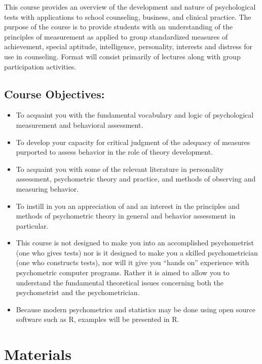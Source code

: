 \documentclass[
]{book}
\providecommand{\tightlist}{%
  \setlength{\itemsep}{0pt}\setlength{\parskip}{0pt}}
\begin{document}
This course provides an overview of the development and nature of psychological tests with applications to school counseling, business, and clinical practice. The purpose of the course is to provide students with an understanding of the principles of measurement as applied to group standardized measures of achievement, special aptitude, intelligence, personality, interests and distress for use in counseling. Format will consist primarily of lectures along with group participation activities.

\hypertarget{course-objectives}{%
\subsection{Course Objectives:}\label{course-objectives}}

\begin{itemize}
\tightlist
\item
  To acquaint you with the fundamental vocabulary and logic of psychological measurement and behavioral assessment.
\item
  To develop your capacity for critical judgment of the adequacy of measures purported to assess behavior in the role of theory development.
\item
  To acquaint you with some of the relevant literature in personality assessment, psychometric theory and practice, and methods of observing and measuring behavior.
\item
  To instill in you an appreciation of and an interest in the principles and methods of psychometric theory in general and behavior assessment in particular.
\item
  This course is not designed to make you into an accomplished psychometrist (one who gives tests) nor is it designed to make you a skilled psychometrician (one who constructs tests), nor will it give you ``hands on'' experience with psychometric computer programs. Rather it is aimed to allow you to understand the fundamental theoretical issues concerning both the psychometrist and the psychometrician.
\item
  Because modern psychometrics and statistics may be done using open source software such as R, examples will be presented in R.
\end{itemize}

\hypertarget{materials-1}{%
\section{Materials}\label{materials-1}}
\end{document}
